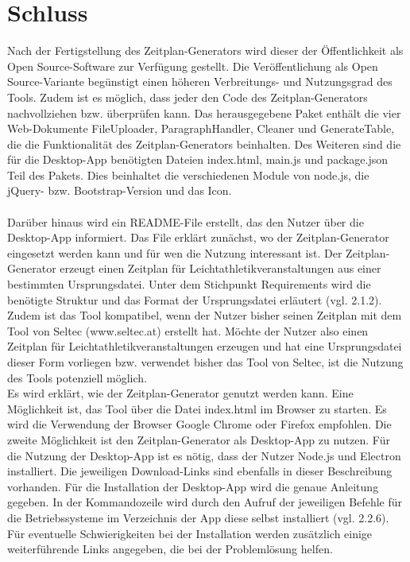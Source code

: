 
\chapter{Schluss}
\label{chap:Schluss}

Nach der Fertigstellung des Zeitplan-Generators wird dieser der Öffentlichkeit als Open Source-Software zur Verfügung gestellt. Die Veröffentlichung als Open Source-Variante begünstigt einen höheren Verbreitungs- und Nutzungsgrad des Tools. Zudem ist es möglich, dass jeder den Code des Zeitplan-Generators nachvollziehen bzw. überprüfen kann. 
Das herausgegebene Paket enthält die vier Web-Dokumente FileUploader, ParagraphHandler, Cleaner und GenerateTable, die die Funktionalität des Zeitplan-Generators beinhalten. Des Weiteren sind die für die Desktop-App benötigten Dateien index.html, main.js und package.json Teil des Pakets. Dies beinhaltet die verschiedenen Module von node.js, die jQuery- bzw. Bootstrap-Version und das Icon. \\
\\
Darüber hinaus wird ein README-File erstellt, das den Nutzer über die Desktop-App informiert. Das File erklärt zunächst, wo der Zeitplan-Generator eingesetzt werden kann und für wen die Nutzung interessant ist. Der Zeitplan-Generator erzeugt einen Zeitplan für Leichtathletikveranstaltungen aus einer bestimmten Ursprungsdatei. Unter dem Stichpunkt Requirements wird die benötigte Struktur und das Format der Ursprungsdatei erläutert (vgl. 2.1.2). Zudem ist das Tool kompatibel, wenn der Nutzer bisher seinen Zeitplan mit dem Tool von Seltec (www.seltec.at) erstellt hat. Möchte der Nutzer also einen Zeitplan für Leichtathletikveranstaltungen erzeugen und hat eine Ursprungsdatei dieser Form vorliegen bzw. verwendet bisher das Tool von Seltec, ist die Nutzung des Tools potenziell möglich.\\
Es wird erklärt, wie der Zeitplan-Generator genutzt werden kann. Eine Möglichkeit ist, das Tool über die Datei index.html im Browser zu starten. Es wird die Verwendung der Browser Google Chrome oder Firefox empfohlen. 
Die zweite Möglichkeit ist den Zeitplan-Generator als Desktop-App zu nutzen. Für die Nutzung der Desktop-App ist es nötig, dass der Nutzer Node.js und Electron installiert. Die jeweiligen Download-Links sind ebenfalls in dieser Beschreibung vorhanden. Für die Installation der Desktop-App wird die genaue Anleitung gegeben. In der Kommandozeile wird durch den Aufruf der jeweiligen Befehle für die Betriebssysteme im Verzeichnis der App diese selbst installiert (vgl. 2.2.6). Für eventuelle Schwierigkeiten bei der Installation werden zusätzlich einige weiterführende Links angegeben, die bei der Problemlösung helfen.\\
